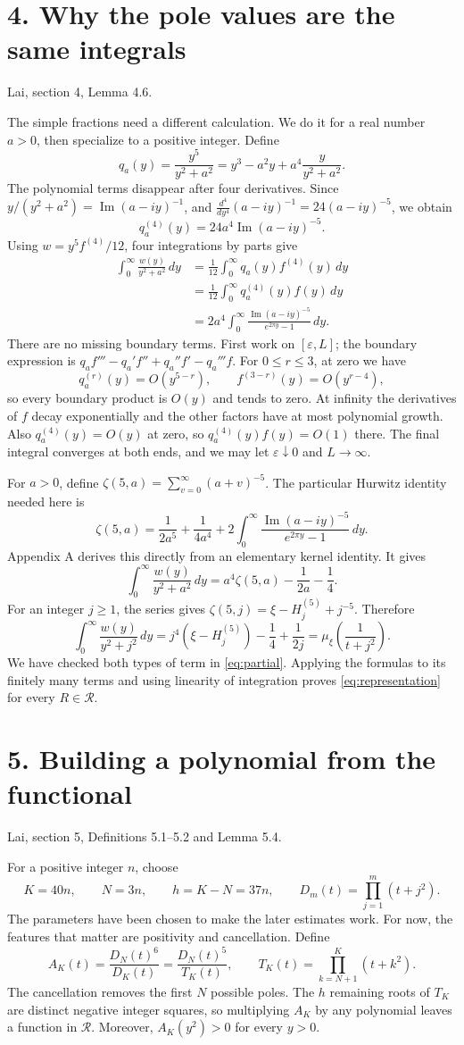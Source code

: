 \documentclass[11pt]{article}
\newcommand{\dd}{\,d}
\newcommand{\Hfive}[1]{H_{#1}^{(5)}}
\newcommand{\source}[1]{{\small\color{blue!45!black}#1}\par}
\newcommand{\heading}[2]{\section*{#1}\source{#2}}
\begin{document}
\newpage
\heading{4. Why the pole values are the same integrals}{Lai, section 4, Lemma 4.6.}
The simple fractions need a different calculation. We do it for a real
number $a>0$, then specialize to a positive integer. Define
\[
 q_a(y)=\frac{y^5}{y^2+a^2}
       =y^3-a^2y+a^4\frac{y}{y^2+a^2}.
\]
The polynomial terms disappear after four derivatives. Since
$y/(y^2+a^2)=\operatorname{Im}(a-iy)^{-1}$, and
$\frac{d^4}{dy^4}(a-iy)^{-1}=24(a-iy)^{-5}$, we obtain
\[
 q_a^{(4)}(y)=24a^4\operatorname{Im}(a-iy)^{-5}.
\]
Using $w=y^5f^{(4)}/12$, four integrations by parts give
\begin{align*}
 \int_0^\infty\frac{w(y)}{y^2+a^2}\dd y
 &=\frac1{12}\int_0^\infty q_a(y)f^{(4)}(y)\dd y\\
 &=\frac1{12}\int_0^\infty q_a^{(4)}(y)f(y)\dd y\\
 &=2a^4\int_0^\infty
     \frac{\operatorname{Im}(a-iy)^{-5}}{e^{2\pi y}-1}\dd y.
\end{align*}
There are no missing boundary terms. First work on $[\varepsilon,L]$;
the boundary expression is
$q_af'''-q_a'f''+q_a''f'-q_a'''f$.
For $0\leq r\leq3$, at zero we have
\[
 q_a^{(r)}(y)=O(y^{5-r}),\qquad
 f^{(3-r)}(y)=O(y^{r-4}),
\]
so every boundary product is $O(y)$ and tends to zero. At infinity the
derivatives of $f$ decay exponentially and the other factors have at most
polynomial growth. Also $q_a^{(4)}(y)=O(y)$ at zero, so
$q_a^{(4)}(y)f(y)=O(1)$ there. The final integral converges at both ends,
and we may let $\varepsilon\downarrow0$ and $L\to\infty$.

For $a>0$, define $\zeta(5,a)=\sum_{v=0}^\infty(a+v)^{-5}$.
The particular Hurwitz identity needed here is
\begin{equation}\label{eq:hermite}
 \zeta(5,a)=\frac1{2a^5}+\frac1{4a^4}
 +2\int_0^\infty
     \frac{\operatorname{Im}(a-iy)^{-5}}{e^{2\pi y}-1}\dd y.
\end{equation}
Appendix A derives this directly from an elementary kernel identity.
It gives
\[
 \int_0^\infty\frac{w(y)}{y^2+a^2}\dd y
 =a^4\zeta(5,a)-\frac1{2a}-\frac14.
\]
For an integer $j\geq1$, the series gives
$\zeta(5,j)=\xi-\Hfive{j}+j^{-5}$. Therefore
\[
 \int_0^\infty\frac{w(y)}{y^2+j^2}\dd y
 =j^4(\xi-\Hfive{j})-\frac14+\frac1{2j}
 =\mu_\xi\!\left(\frac1{t+j^2}\right).
\]
We have checked both types of term in \eqref{eq:partial}.
Applying the formulas to its finitely many terms and using linearity
of integration proves \eqref{eq:representation} for every $R\in\mathcal R$.

\newpage
\heading{5. Building a polynomial from the functional}{Lai, section 5, Definitions 5.1--5.2 and Lemma 5.4.}
For a positive integer $n$, choose
\[
 K=40n,\qquad N=3n,\qquad h=K-N=37n,
 \qquad D_m(t)=\prod_{j=1}^m(t+j^2).
\]
The parameters have been chosen to make the later estimates work.
For now, the features that matter are positivity and cancellation. Define
\[
 A_K(t)=\frac{D_N(t)^6}{D_K(t)}
       =\frac{D_N(t)^5}{T_K(t)},\qquad
 T_K(t)=\prod_{k=N+1}^K(t+k^2).
\]
The cancellation removes the first $N$ possible poles. The $h$ remaining
roots of $T_K$ are distinct negative integer squares, so multiplying
$A_K$ by any polynomial leaves a function in $\mathcal R$.
Moreover, $A_K(y^2)>0$ for every $y>0$.
\end{document}
